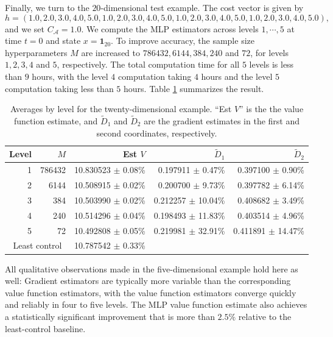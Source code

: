 \documentclass[11pt]{article}
\theoremstyle{definition}
\theoremstyle{plain}
\begin{document}
Finally, we turn to the $20$-dimensional test example. The cost vector is given by 
\[
h = (1.0, 2.0, 3.0, 4.0, 5.0, 1.0, 2.0, 3.0, 4.0, 5.0, 1.0, 2.0, 3.0, 4.0, 5.0, 1.0, 2.0, 3.0, 4.0, 5.0),
\]
and we set $C_{\mathcal{A}}=1.0$. We compute the MLP estimators across levels $1, \cdots, 5$ at time $t=0$ and state $x=\mathbf{1}_{20}$. 
To improve accuracy, the sample size hyperparameters $M$ are increased to $786432, 6144, 384, 240$ and $72$, 
for levels $1, 2, 3, 4$ and $5$, respectively. 
The total computation time for all $5$ levels is less than $9$ hours, 
with the level $4$ computation taking $4$ hours and the level $5$ computation taking less than $5$ hours. 
Table \ref{tab:twenty-dim-averages} summarizes the result.
\begin{table}[t]
  \centering
  \caption{Averages by level for the twenty-dimensional example. ``Est $V$'' is the the value function estimate, 
  and $\tilde D_1$ and $\tilde D_2$ are the gradient estimates in the first and second coordinates, respectively.}
  \label{tab:twenty-dim-averages}
  \begin{tabular}{r r r r r}
    \toprule
    Level & $M$ & Est $V$ & $\tilde D_1$ & $\tilde D_2$ \\
    \midrule
    1 & 786432 & 10.830523 $\pm$ 0.08\% & 0.197911 $\pm$ 0.47\% & 0.397100 $\pm$ 0.90\% \\
    2 & 6144 & 10.508915 $\pm$ 0.02\% & 0.200700 $\pm$ 9.73\% & 0.397782 $\pm$ 6.14\% \\
    3 & 384 & 10.503990 $\pm$ 0.02\% & 0.212257 $\pm$ 10.04\% & 0.408682 $\pm$ 3.49\% \\
    4 & 240 & 10.514296 $\pm$ 0.04\% & 0.198493 $\pm$ 11.83\% & 0.403514 $\pm$ 4.96\% \\
    5 & 72 & 10.492808 $\pm$ 0.05\% & 0.219981 $\pm$ 32.91\% & 0.411891 $\pm$ 14.47\% \\
    \midrule
    \multicolumn{2}{c}{Least control} & 10.787542 $\pm$ 0.33\% &  &  \\
    \bottomrule
  \end{tabular}
\end{table}
All qualitative observations made in the five-dimensional example hold here as well: 
Gradient estimators are typically more variable than the corresponding value function estimators, 
with the value function estimators converge quickly and reliably in four to five levels. 
The MLP value function estimate also achieves a statistically significant improvement 
that is more than $2.5\%$ relative to the least-control baseline. 
\end{document}
